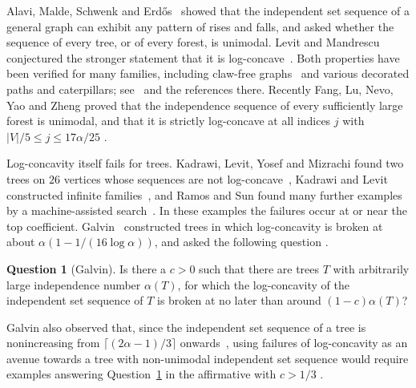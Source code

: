 \documentclass{amsart}
\theoremstyle{definition}
\newtheorem{question}[theorem]{Question}
\theoremstyle{remark}
\numberwithin{equation}{section}
\newcommand{\abs}[1]{\lvert #1\rvert}
\begin{document}
Alavi, Malde, Schwenk and Erd\H{o}s~\cite{AMSE87} showed that the independent set sequence of a general graph can exhibit any pattern of rises and falls, and asked whether the sequence of every tree, or of every forest, is unimodal. Levit and Mandrescu conjectured the stronger statement that it is log-concave~\cite{LM04}. Both properties have been verified for many families, including claw-free graphs~\cite{Ham90,CS07} and various decorated paths and caterpillars; see~\cite{GH18} and the references there. Recently Fang, Lu, Nevo, Yao and Zheng proved that the independence sequence of every sufficiently large forest is unimodal, and that it is strictly log-concave at all indices $j$ with $\abs{V}/5\le j\le 17\alpha/25$ \cite[Theorems~1.1 and~1.2]{FLNYZ26}.

Log-concavity itself fails for trees. Kadrawi, Levit, Yosef and Mizrachi found two trees on $26$ vertices whose sequences are not log-concave~\cite{KLYM23}, Kadrawi and Levit constructed infinite families~\cite{KL25}, and Ramos and Sun found many further examples by a machine-assisted search~\cite{RS25}. In these examples the failures occur at or near the top coefficient. Galvin~\cite[Theorem~1.3]{Gal26} constructed trees in which log-concavity is broken at about $\alpha(1-1/(16\log\alpha))$, and asked the following question \cite[Question~3.1]{Gal26}.

\begin{question}[Galvin]\label{q:galvin}
Is there a $c>0$ such that there are trees $T$ with arbitrarily large independence number $\alpha(T)$, for which the log-concavity of the independent set sequence of $T$ is broken at no later than around $(1-c)\alpha(T)$?
\end{question}

Galvin also observed that, since the independent set sequence of a tree is nonincreasing from $\lceil(2\alpha-1)/3\rceil$ onwards~\cite{LM06}, using failures of log-concavity as an avenue towards a tree with non-unimodal independent set sequence would require examples answering Question~\ref{q:galvin} in the affirmative with $c>1/3$ \cite[Section~3]{Gal26}.
\end{document}
